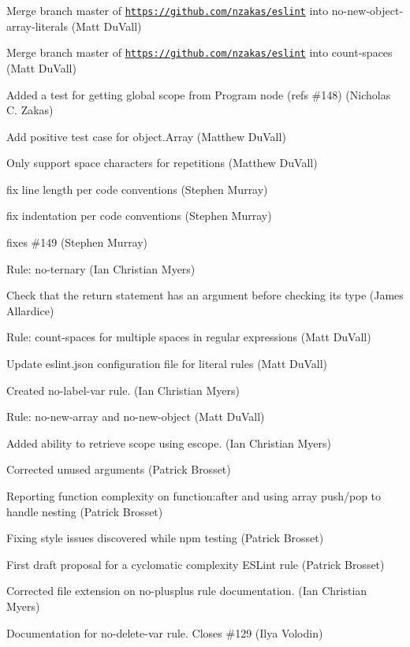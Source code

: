 \begin{DoxyItemize}
\item Merge branch \textquotesingle{}master\textquotesingle{} of \href{https://github.com/nzakas/eslint}{\tt https\+://github.\+com/nzakas/eslint} into no-\/new-\/object-\/array-\/literals (Matt Du\+Vall)
\item Merge branch \textquotesingle{}master\textquotesingle{} of \href{https://github.com/nzakas/eslint}{\tt https\+://github.\+com/nzakas/eslint} into count-\/spaces (Matt Du\+Vall)
\item Added a test for getting global scope from Program node (refs \#148) (Nicholas C. Zakas)
\item Add positive test case for {\ttfamily object.\+Array} (Matthew Du\+Vall)
\item Only support space characters for repetitions (Matthew Du\+Vall)
\item fix line length per code conventions (Stephen Murray)
\item fix indentation per code conventions (Stephen Murray)
\item fixes \#149 (Stephen Murray)
\item Rule\+: no-\/ternary (Ian Christian Myers)
\item Check that the return statement has an argument before checking its type (James Allardice)
\item Rule\+: count-\/spaces for multiple spaces in regular expressions (Matt Du\+Vall)
\item Update eslint.\+json configuration file for literal rules (Matt Du\+Vall)
\item Created no-\/label-\/var rule. (Ian Christian Myers)
\item Rule\+: no-\/new-\/array and no-\/new-\/object (Matt Du\+Vall)
\item Added ability to retrieve scope using escope. (Ian Christian Myers)
\item Corrected unused arguments (Patrick Brosset)
\item Reporting function complexity on function\+:after and using array push/pop to handle nesting (Patrick Brosset)
\item Fixing style issues discovered while npm testing (Patrick Brosset)
\item First draft proposal for a cyclomatic complexity E\+S\+Lint rule (Patrick Brosset)
\item Corrected file extension on no-\/plusplus rule documentation. (Ian Christian Myers)
\item Documentation for no-\/delete-\/var rule. Closes \#129 (Ilya Volodin)

\end{DoxyItemize}
